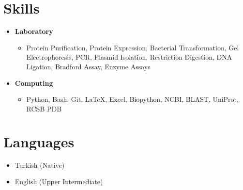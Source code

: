 \documentclass[a4paper,10pt]{article}
\begin{document}
\vspace{0.5em}

\section*{Skills}
\begin{itemize}[left=0pt]
    \item \textbf{Laboratory}    
    \begin{itemize}
        \item {Protein Purification, Protein Expression, Bacterial Transformation, Gel Electrophoresis, PCR, Plasmid Isolation, Restriction Digestion, DNA Ligation, Bradford Assay, Enzyme Assays}
    \end{itemize}
    \item \textbf{Computing}
        \begin{itemize}
            \item {Python, Bash, Git, LaTeX, Excel, Biopython, NCBI, BLAST, UniProt, RCSB PDB}  
        \end{itemize}
\end{itemize}

\vspace{0.5em}

\section*{Languages}
\begin{itemize}[left=0pt]
    \item Turkish (Native)
    \item English (Upper Intermediate)
\end{itemize}
\end{document}
